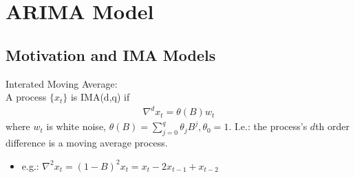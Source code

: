 \chapter{ARIMA Model}
\section{Motivation and IMA Models}
Interated Moving Average: \\
A process $\{ x_t\}$ is IMA(d,q) if 
    \begin{align*}
        \nabla^d x_t = \theta(B)w_t
    \end{align*}
where $w_t$ is white noise, $\theta(B) = \sum_{j=0}^q \theta_j B^j, \theta_0 = 1$. I.e.: the process's $d$th order difference is a moving average process. \\
    \begin{itemize}
        \item e.g.: $\nabla^2 x_t = (1-B)^2 x_t = x_t - 2x_{t-1} + x_{t-2}$
    \end{itemize}
    
